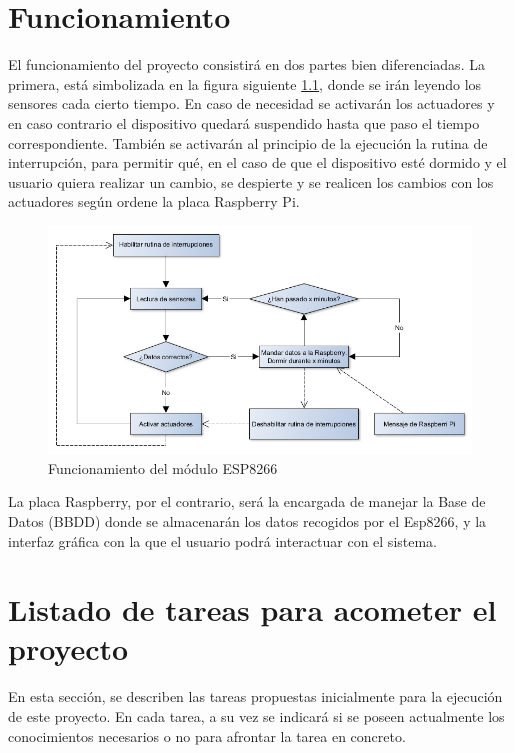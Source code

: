 \documentclass[12pt,a4paper,titlepage,oneside]{report}
\begin{document}
\chapter{Funcionamiento}

	El funcionamiento del proyecto consistirá en dos partes bien diferenciadas. La primera, está simbolizada en la figura siguiente \ref{Funcionamiento}, donde se irán leyendo los sensores cada cierto tiempo. En caso de necesidad se activarán los actuadores y en caso contrario el dispositivo quedará suspendido hasta que paso el tiempo correspondiente. También se activarán al principio de la ejecución la rutina de interrupción, para permitir qué, en el caso de que el dispositivo esté dormido y el usuario quiera realizar un cambio, se despierte y se realicen los cambios con los actuadores según ordene la placa Raspberry Pi.

	\begin{figure}
		\center
		\includegraphics[scale=0.5]{./images/funcionamientoESP8266.jpg}
		\caption{Funcionamiento del módulo ESP8266}
		\label{Funcionamiento}
	\end{figure}
	
	La placa Raspberry, por el contrario, será la encargada de manejar la Base de Datos (BBDD) donde se almacenarán los datos recogidos por el Esp8266, y la interfaz gráfica con la que el usuario podrá interactuar con el sistema.

\chapter{Listado de tareas para acometer el proyecto }

	En esta sección, se describen las tareas propuestas inicialmente para la ejecución de este proyecto. En cada tarea, a su vez se indicará si se poseen actualmente los conocimientos necesarios o no para afrontar la tarea en concreto.
	
\end{document}
